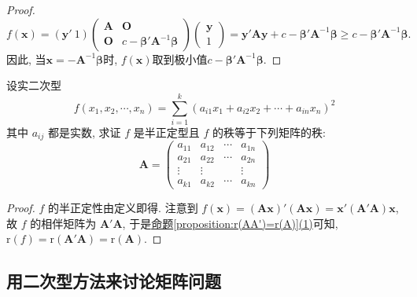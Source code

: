 \documentclass[../../main.tex]{subfiles}
\begin{document}
\begin{proof}
\[
f(\boldsymbol{x})=(\boldsymbol{y}'\ 1)\begin{pmatrix}
\boldsymbol{A} & \boldsymbol{O} \\
\boldsymbol{O} & c - \boldsymbol{\beta}'\boldsymbol{A}^{-1}\boldsymbol{\beta}
\end{pmatrix}\begin{pmatrix}
\boldsymbol{y} \\
1
\end{pmatrix}=\boldsymbol{y}'\boldsymbol{A}\boldsymbol{y}+c - \boldsymbol{\beta}'\boldsymbol{A}^{-1}\boldsymbol{\beta}\geqslant  c - \boldsymbol{\beta}'\boldsymbol{A}^{-1}\boldsymbol{\beta}.
\]
因此, 当$\boldsymbol{x}=-\boldsymbol{A}^{-1}\boldsymbol{\beta}$时, $f(\boldsymbol{x})$取到极小值$c - \boldsymbol{\beta}'\boldsymbol{A}^{-1}\boldsymbol{\beta}$. 

\end{proof}

\begin{proposition}\label{proposition:和的平方和的半正定型的秩等于其系数矩阵的秩}
设实二次型
\[f(x_1,x_2,\cdots,x_n)=\sum_{i = 1}^{k}(a_{i1}x_1 + a_{i2}x_2 + \cdots + a_{in}x_n)^2\]
其中 \(a_{ij}\) 都是实数, 求证 \(f\) 是半正定型且 \(f\) 的秩等于下列矩阵的秩:
\[
\boldsymbol{A} = \begin{pmatrix}
a_{11} & a_{12} & \cdots & a_{1n} \\
a_{21} & a_{22} & \cdots & a_{2n} \\
\vdots & \vdots & & \vdots \\
a_{k1} & a_{k2} & \cdots & a_{kn}
\end{pmatrix}
\]
\end{proposition}
\begin{proof}
\(f\) 的半正定性由定义即得. 注意到 \(f(\boldsymbol{x}) = (\boldsymbol{A}\boldsymbol{x})'(\boldsymbol{A}\boldsymbol{x}) = \boldsymbol{x}'(\boldsymbol{A}'\boldsymbol{A})\boldsymbol{x}\), 故 \(f\) 的相伴矩阵为 \(\boldsymbol{A}'\boldsymbol{A}\), 于是\hyperref[proposition:r(AA')=r(A)]{命题\ref{proposition:r(AA')=r(A)}(1)}可知, \(\mathrm{r}(f)=\mathrm{r}(\boldsymbol{A}'\boldsymbol{A})=\mathrm{r}(\boldsymbol{A})\). 

\end{proof}

\subsection{用二次型方法来讨论矩阵问题}
\end{document}
